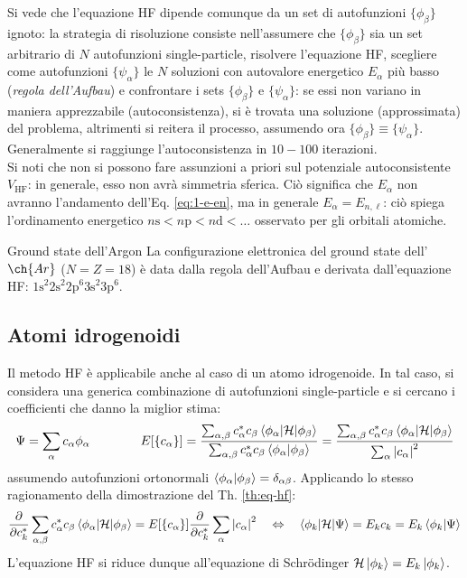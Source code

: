 Si vede che l'equazione HF dipende comunque da un set di autofunzioni $ \{\phi_\beta\} $ ignoto: la strategia di risoluzione consiste nell'assumere che $ \{\phi_\beta\} $ sia un set arbitrario di $ N $ autofunzioni single-particle, risolvere l'equazione HF, scegliere come autofunzioni $ \{\psi_\alpha\} $ le $ N $ soluzioni con autovalore energetico $ E_\alpha $ più basso (\textit{regola dell'Aufbau}) e confrontare i sets $ \{\phi_\beta\} $ e $ \{\psi_\alpha\} $: se essi non variano in maniera apprezzabile (autoconsistenza), si è trovata una soluzione (approssimata) del problema, altrimenti si reitera il processo, assumendo ora $ \{\phi_\beta\} \equiv \{\psi_\alpha\} $. Generalmente si raggiunge l'autoconsistenza in $ 10-100 $ iterazioni. \\
Si noti che non si possono fare assunzioni a priori sul potenziale autoconsistente $ V_\text{HF} $: in  generale, esso non avrà simmetria sferica. Ciò significa che $ E_\alpha $ non avranno l'andamento dell'Eq. \ref{eq:1-e-en}, ma in generale $ E_\alpha = E_{n,\ell} $: ciò spiega l'ordinamento energetico $ n\text{s} < n\text{p} < n\text{d} < \dots $ osservato per gli orbitali atomiche.

\begin{example}{Ground state dell'Argon}{}
	La configurazione elettronica del ground state dell'$ \ch{Ar} $ ($ N = Z = 18 $) è data dalla regola dell'Aufbau e derivata dall'equazione HF: $ \text{1s}^2 \text{2s}^2 \text{2p}^6 \text{3s}^2 \text{3p}^6 $.
\end{example}

\subsection{Atomi idrogenoidi}

Il metodo HF è applicabile anche al caso di un atomo idrogenoide. In tal caso, si considera una generica combinazione di autofunzioni single-particle e si cercano i coefficienti che danno la miglior stima:
\begin{equation*}
	\Psi = \sum_\alpha c_\alpha \phi_\alpha
	\qquad \qquad
	E[\{c_\alpha\}] = \frac{\sum_{\alpha,\beta} c_\alpha^* c_\beta \braket{\phi_\alpha | \mathcal{H} | \phi_\beta}}{\sum_{\alpha,\beta} c_\alpha^* c_\beta \braket{\phi_\alpha | \phi_\beta}} = \frac{\sum_{\alpha,\beta} c_\alpha^* c_\beta \braket{\phi_\alpha | \mathcal{H} | \phi_\beta}}{\sum_\alpha \left\lvert c_\alpha\right\rvert^2}
\end{equation*}
assumendo autofunzioni ortonormali $ \braket{\phi_\alpha | \phi_\beta} = \delta_{\alpha\beta} $. Applicando lo stesso ragionamento della dimostrazione del Th. \ref{th:eq-hf}:
\begin{equation*}
	\frac{\partial}{\partial c_k^*} \sum_{\alpha,\beta} c_\alpha^* c_\beta \braket{\phi_\alpha | \mathcal{H} | \phi_\beta} = E[\{c_\alpha\}] \frac{\partial}{\partial c_k^*} \sum_\alpha \left\lvert c_\alpha\right\rvert^2
	\quad \Leftrightarrow \quad
	\braket{\phi_k | \mathcal{H} | \Psi} = E_k c_k = E_k \braket{\phi_k | \Psi}
\end{equation*}
L'equazione HF si riduce dunque all'equazione di Schrödinger $ \mathcal{H} \ket{\phi_k} = E_k \ket{\phi_k} $.

